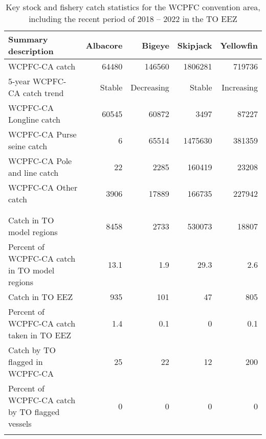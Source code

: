 \begin{longtable}{lrrrr}
\caption{Key stock and fishery catch statistics for the WCPFC convention area, including the recent period of 2018 -- 2022 in the TO EEZ} \\ 
  \hline
Summary description & Albacore & Bigeye & Skipjack & Yellowfin \\ 
  \hline
WCPFC-CA catch & 64480 & 146560 & 1806281 & 719736 \\ 
  5-year WCPFC-CA catch trend & Stable & Decreasing & Stable & Increasing \\ 
  WCPFC-CA Longline catch & 60545 & 60872 & 3497 & 87227 \\ 
  WCPFC-CA Purse seine catch & 6 & 65514 & 1475630 & 381359 \\ 
  WCPFC-CA Pole and line catch & 22 & 2285 & 160419 & 23208 \\ 
  WCPFC-CA Other catch & 3906 & 17889 & 166735 & 227942 \\ 
   &  &  &  &  \\ 
   \hline
 &  &  &  &  \\ 
  Catch in TO model regions & 8458 & 2733 & 530073 & 18807 \\ 
  Percent of WCPFC-CA catch in TO model regions & 13.1 & 1.9 & 29.3 & 2.6 \\ 
  Catch in TO EEZ & 935 & 101 & 47 & 805 \\ 
  Percent of WCPFC-CA catch taken in TO EEZ & 1.4 & 0.1 & 0 & 0.1 \\ 
  Catch by TO flagged in WCPFC-CA & 25 & 22 & 12 & 200 \\ 
  Percent of WCPFC-CA catch by TO flagged vessels & 0 & 0 & 0 & 0 \\ 
  \hline
\label{cat_sum_tab}
\end{longtable}
